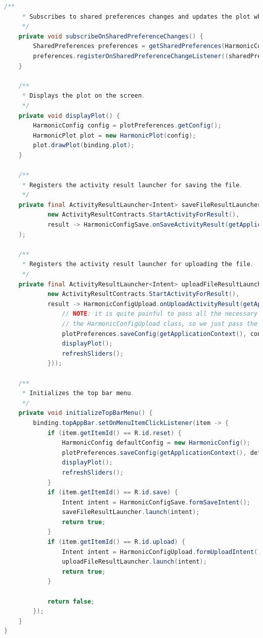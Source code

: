 \documentclass[oneside,solution]{android-assign}
\begin{document}
\begin{lstlisting}[language=java]
    /**
     * Subscribes to shared preferences changes and updates the plot when they change.
     */
    private void subscribeOnSharedPreferenceChanges() {
        SharedPreferences preferences = getSharedPreferences(HarmonicConfigPreferences.PREFERENCES_NAME, Context.MODE_PRIVATE);
        preferences.registerOnSharedPreferenceChangeListener((sharedPreferences, key) -> displayPlot());
    }

    /**
     * Displays the plot on the screen.
     */
    private void displayPlot() {
        HarmonicConfig config = plotPreferences.getConfig();
        HarmonicPlot plot = new HarmonicPlot(config);
        plot.drawPlot(binding.plot);
    }

    /**
     * Registers the activity result launcher for saving the file.
     */
    private final ActivityResultLauncher<Intent> saveFileResultLauncher = registerForActivityResult(
            new ActivityResultContracts.StartActivityForResult(),
            result -> HarmonicConfigSave.onSaveActivityResult(getApplicationContext(), result)
    );

    /**
     * Registers the activity result launcher for uploading the file.
     */
    private final ActivityResultLauncher<Intent> uploadFileResultLauncher = registerForActivityResult(
            new ActivityResultContracts.StartActivityForResult(),
            result -> HarmonicConfigUpload.onUploadActivityResult(getApplicationContext(), result, getSupportFragmentManager(), (HarmonicConfig config) -> {
                // NOTE: it is quite painful to pass all the necessary parameters inside
                // the HarmonicConfigUpload class, so we just pass the Consumer to the method
                plotPreferences.saveConfig(getApplicationContext(), config);
                displayPlot();
                refreshSliders();
            }));

    /**
     * Initializes the top bar menu.
     */
    private void initializeTopBarMenu() {
        binding.topAppBar.setOnMenuItemClickListener(item -> {
            if (item.getItemId() == R.id.reset) {
                HarmonicConfig defaultConfig = new HarmonicConfig();
                plotPreferences.saveConfig(getApplicationContext(), defaultConfig);
                displayPlot();
                refreshSliders();
            }
            if (item.getItemId() == R.id.save) {
                Intent intent = HarmonicConfigSave.formSaveIntent();
                saveFileResultLauncher.launch(intent);
                return true;
            }
            if (item.getItemId() == R.id.upload) {
                Intent intent = HarmonicConfigUpload.formUploadIntent();
                uploadFileResultLauncher.launch(intent);
                return true;
            }

            return false;
        });
    }
}
\end{lstlisting}
\end{document}
